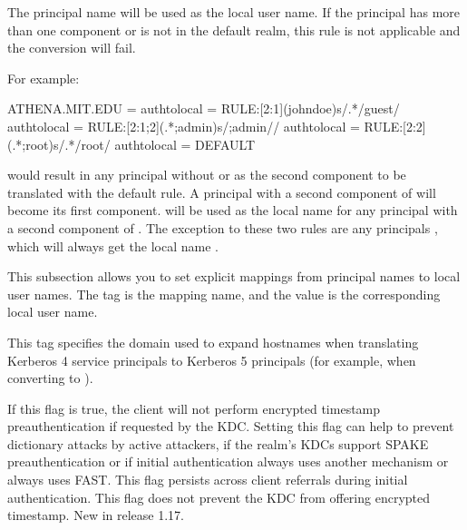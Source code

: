 \documentclass[letterpaper,10pt,english]{sphinxmanual}
\begin{document}
\begin{description}
\begin{description}
\sphinxAtStartPar
The principal name will be used as the local user name.  If
the principal has more than one component or is not in the
default realm, this rule is not applicable and the conversion
will fail.

\end{description}

\sphinxAtStartPar
For example:

\begin{sphinxVerbatim}[commandchars=\\\{\}]
[realms]
    ATHENA.MIT.EDU = \PYGZob{}
        auth\PYGZus{}to\PYGZus{}local = RULE:[2:\PYGZdl{}1](johndoe)s/\PYGZca{}.*\PYGZdl{}/guest/
        auth\PYGZus{}to\PYGZus{}local = RULE:[2:\PYGZdl{}1;\PYGZdl{}2](\PYGZca{}.*;admin\PYGZdl{})s/;admin\PYGZdl{}//
        auth\PYGZus{}to\PYGZus{}local = RULE:[2:\PYGZdl{}2](\PYGZca{}.*;root)s/\PYGZca{}.*\PYGZdl{}/root/
        auth\PYGZus{}to\PYGZus{}local = DEFAULT
    \PYGZcb{}
\end{sphinxVerbatim}

\sphinxAtStartPar
would result in any principal without  or  as the
second component to be translated with the default rule.  A
principal with a second component of  will become its
first component.   will be used as the local name for any
principal with a second component of .  The exception to
these two rules are any principals , which will
always get the local name .

\sphinxAtStartPar
This subsection allows you to set explicit mappings from principal
names to local user names.  The tag is the mapping name, and the
value is the corresponding local user name.

\sphinxAtStartPar
This tag specifies the domain used to expand hostnames when
translating Kerberos 4 service principals to Kerberos 5 principals
(for example, when converting  to
).

\sphinxAtStartPar
If this flag is true, the client will not perform encrypted
timestamp preauthentication if requested by the KDC.  Setting this
flag can help to prevent dictionary attacks by active attackers,
if the realm’s KDCs support SPAKE preauthentication or if initial
authentication always uses another mechanism or always uses FAST.
This flag persists across client referrals during initial
authentication.  This flag does not prevent the KDC from offering
encrypted timestamp.  New in release 1.17.


\end{description}
\end{document}
